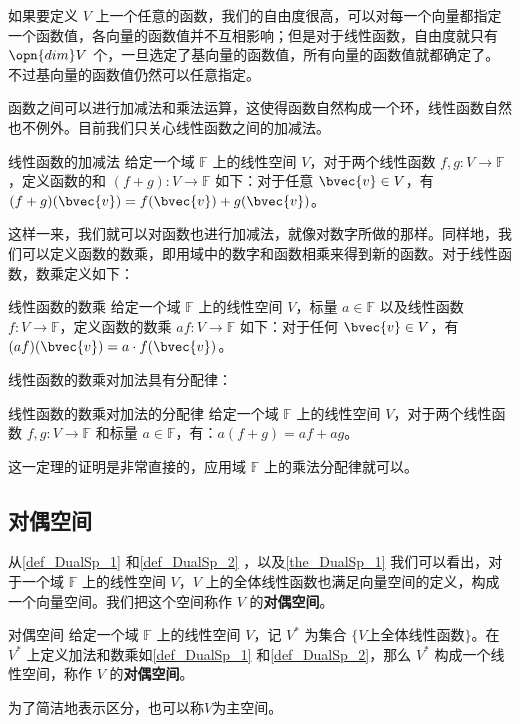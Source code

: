 如果要定义 $V$ 上一个任意的函数，我们的自由度很高，可以对每一个向量都指定一个函数值，各向量的函数值并不互相影响；但是对于线性函数，自由度就只有 $\opn{dim} V$ 个，一旦选定了基向量的函数值，所有向量的函数值就都确定了。不过基向量的函数值仍然可以任意指定。

函数之间可以进行加减法和乘法运算，这使得函数自然构成一个环，线性函数自然也不例外。目前我们只关心线性函数之间的加减法。

\begin{definition}{线性函数的加减法}\label{def_DualSp_1}
给定一个域 $\mathbb{F}$ 上的线性空间 $V$，对于两个线性函数 $f, g: V\rightarrow\mathbb{F}$，定义函数的和 $(f+g):V\rightarrow\mathbb{F}$ 如下：对于任意 $\bvec{v}\in V$，有 $(f+g)(\bvec{v})=f(\bvec{v})+g(\bvec{v})$。
\end{definition}

这样一来，我们就可以对函数也进行加减法，就像对数字所做的那样。同样地，我们可以定义函数的数乘，即用域中的数字和函数相乘来得到新的函数。对于线性函数，数乘定义如下：

\begin{definition}{线性函数的数乘}\label{def_DualSp_2}
给定一个域 $\mathbb{F}$ 上的线性空间 $V$，标量 $a\in\mathbb{F}$ 以及线性函数 $f: V\rightarrow\mathbb{F}$，定义函数的数乘 $af:V\rightarrow\mathbb{F}$ 如下：对于任何 $\bvec{v}\in V$，有 $(af)(\bvec{v})=a\cdot f(\bvec{v})$。
\end{definition}

线性函数的数乘对加法具有分配律：

\begin{theorem}{线性函数的数乘对加法的分配律}\label{the_DualSp_1}
给定一个域 $\mathbb{F}$ 上的线性空间 $V$，对于两个线性函数 $f, g: V\rightarrow\mathbb{F}$ 和标量 $a\in\mathbb{F}$，有：$a(f+g)=af+ag$。
\end{theorem}

这一定理的证明是非常直接的，应用域 $\mathbb{F}$ 上的乘法分配律就可以。

\subsection{对偶空间}

从\autoref{def_DualSp_1} 和\autoref{def_DualSp_2} ，以及\autoref{the_DualSp_1} 我们可以看出，对于一个域 $\mathbb{F}$ 上的线性空间 $V$，$V$ 上的全体线性函数也满足向量空间的定义，构成一个向量空间。我们把这个空间称作 $V$ 的\textbf{对偶空间}。

\begin{definition}{对偶空间}
给定一个域 $\mathbb{F}$ 上的线性空间 $V$，记 $V^*$ 为集合 $\{V\text{上全体线性函数}\}$。在 $V^*$ 上定义加法和数乘如\autoref{def_DualSp_1} 和\autoref{def_DualSp_2}，那么 $V^*$ 构成一个线性空间，称作 $V$ 的\textbf{对偶空间}。

为了简洁地表示区分，也可以称$V$为主空间。
\end{definition}

